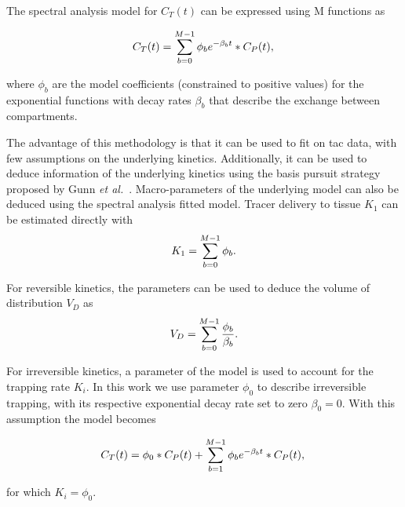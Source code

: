 The spectral analysis model for $C_T(t)$ can be expressed using M functions as

\begin{equation} 
\label{eqn:SpectralModel}
C_{T}(t)  =  \sum_{b=0}^{M-1} {\phi_b}  e^{-\beta_b t} \ast C_P(t)   \\ , \\
\end{equation}

where $\phi_b$ are the model coefficients (constrained to positive values) for the exponential functions with decay rates $\beta_b$ that describe the exchange between compartments. 

The advantage of this methodology is that it can be used to fit on \gls{tac} data, with few assumptions on the underlying kinetics. Additionally, it can be used to deduce information of the underlying kinetics using the basis pursuit strategy proposed by Gunn \textit{et al.}~\cite{Gunn2002}.
Macro-parameters of the underlying model can also be deduced using the spectral analysis fitted model. Tracer delivery to tissue $K_1$ can be estimated directly with
\begin{equation} 
\label{eqn:SpectralModel_K1}
K_1  =  \sum_{b=0}^{M-1} {\phi_b}   \\ . \\
\end{equation}

For reversible kinetics, the parameters can be used to deduce the volume of distribution $V_D$ as
\begin{equation} 
\label{eqn:SpectralModel_VD}
V_D  =  \sum_{b=0}^{M-1} \frac{\phi_b}{\beta_b}   \\ . \\
\end{equation}

For irreversible kinetics, a parameter of the model is used to account for the trapping rate $K_i$. In this work we use parameter ${\phi_0}$ to describe irreversible trapping, with its respective exponential decay rate set to zero ${\beta_0} = 0 $. With this assumption the model becomes

\begin{equation} 
\label{eqn:SpectralModel_Complete}
C_{T}(t)  = \phi_0 \ast C_P(t) + \sum_{b=1}^{M-1} {\phi_b}  e^{-\beta_b t} \ast C_P(t)  \\ , \\
\end{equation}

for which $K_i = {\phi_0}$. 

